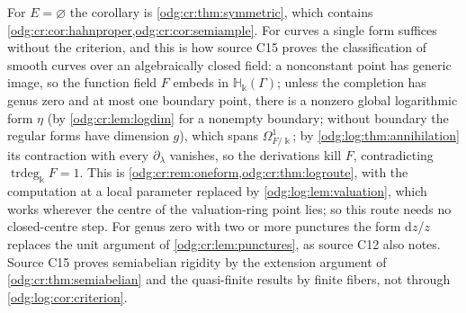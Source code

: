 \documentclass[11pt,oneside]{article}
\numberwithin{equation}{section}
\theoremstyle{definition}
\theoremstyle{remark}
\newcommand{\crH}{\mathbb H_\Bbbk(\Gamma)}
\newcommand{\trdeg}{\operatorname{trdeg}}
\newcommand{\dif}{\mathrm d}
\begin{document}
For $E=\varnothing$ the corollary is \cref{odg:cr:thm:symmetric}, which contains
\cref{odg:cr:cor:hahnproper,odg:cr:cor:semiample}. For curves a single form suffices
without the criterion, and this is how source C15 proves the classification of smooth
curves over an algebraically closed field: a nonconstant point has generic image, so the
function field $F$ embeds in $\crH$; unless the completion has genus zero and at most one
boundary point, there is a nonzero global logarithmic form $\eta$ (by
\cref{odg:cr:lem:logdim} for a nonempty boundary; without boundary the regular forms have
dimension $g$), which spans $\Omega^1_{F/\Bbbk}$; by
\cref{odg:log:thm:annihilation} its contraction with every $\partial_\lambda$ vanishes, so
the derivations kill $F$, contradicting $\trdeg_\Bbbk F=1$. This is
\cref{odg:cr:rem:oneform,odg:cr:thm:logroute}, with the computation at a local parameter
replaced by \cref{odg:log:lem:valuation}, which works wherever the centre of the
valuation-ring point lies; so this route needs no closed-centre step. For genus zero with
two or more punctures the form $\dif z/z$ replaces the unit argument of
\cref{odg:cr:lem:punctures}, as source C12 also notes. Source C15 proves semiabelian
rigidity by the extension argument of \cref{odg:cr:thm:semiabelian} and the quasi-finite
results by finite fibers, not through \cref{odg:log:cor:criterion}.
\end{document}
